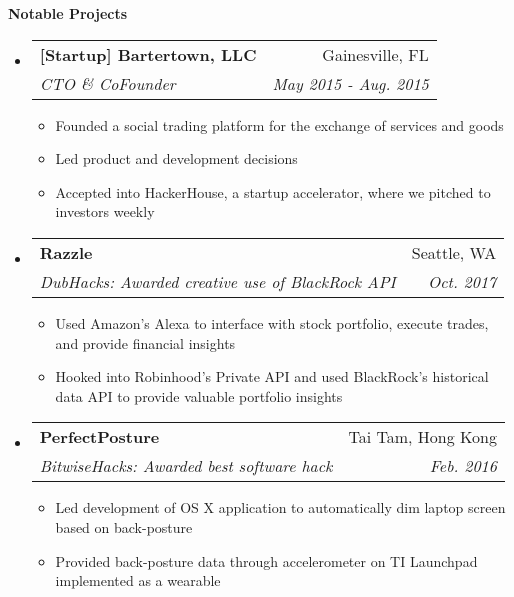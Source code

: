 \documentclass[letterpaper,10pt]{article}
\makeatletter
\newcommand{\resitem}[1]{\item #1 \vspace{-2pt}}
\newcommand{\resheading}[1]{{\large \colorbox{mygrey}{\begin{minipage}{\textwidth}{\textbf{#1 \vphantom{p\^{E}}}}\end{minipage}}}}
\newcommand{\ressubheading}[4]{
\begin{tabular*}{7.0in}{l@{\extracolsep{\fill}}r}
		\textbf{#1} & #2 \\
		\textit{#3} & \textit{#4} \\
\end{tabular*}\vspace{-6pt}}
\makeatother
\begin{document}
\resheading{Notable Projects}
\begin{itemize}
\item
	\ressubheading{[Startup] Bartertown, LLC}{Gainesville, FL}{CTO \& CoFounder}{May 2015 - Aug. 2015}
	\begin{itemize}
        \resitem{Founded a social trading platform for the exchange of services and goods}
        \resitem{Led product and development decisions}
        \resitem{Accepted into HackerHouse, a startup accelerator, where we pitched to investors weekly}
    \end{itemize}
\item
	\ressubheading{Razzle}{Seattle, WA}{DubHacks: Awarded creative use of BlackRock API}{Oct. 2017}
	\begin{itemize}
		\resitem{Used Amazon's Alexa to interface with stock portfolio, execute trades, and provide financial insights}
		\resitem{Hooked into Robinhood's Private API and used BlackRock's historical data API to provide valuable portfolio insights}
	\end{itemize}
\item
	\ressubheading{PerfectPosture}{Tai Tam, Hong Kong}{BitwiseHacks: Awarded best software hack}{Feb. 2016}
	\begin{itemize}
		\resitem{Led development of OS X application to automatically dim laptop screen based on back-posture}
		\resitem{Provided back-posture data through accelerometer on TI Launchpad implemented as a wearable}
    \end{itemize}
\end{itemize}
    
\end{document}
